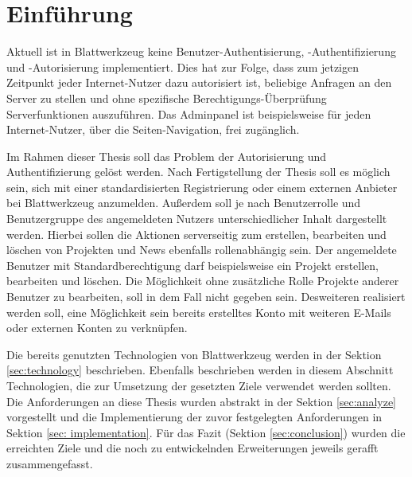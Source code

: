 \section{Einführung}
\label{sec:introduction}
Aktuell ist in Blattwerkzeug keine Benutzer-Authentisierung, -Authentifizierung und -Autorisierung implementiert. Dies hat zur Folge, dass zum jetzigen Zeitpunkt jeder Internet-Nutzer dazu autorisiert ist, beliebige Anfragen an den Server zu stellen und ohne spezifische Berechtigungs-Überprüfung Serverfunktionen auszuführen. Das Adminpanel ist beispielsweise für jeden Internet-Nutzer, über die Seiten-Navigation, frei zugänglich.

Im Rahmen dieser Thesis soll das Problem der Autorisierung und Authentifizierung gelöst werden. Nach Fertigstellung der Thesis soll es möglich sein, sich mit einer standardisierten Registrierung oder einem externen Anbieter bei Blattwerkzeug anzumelden. Au{\ss}erdem soll je nach Benutzerrolle und Benutzergruppe des angemeldeten Nutzers unterschiedlicher Inhalt dargestellt werden. Hierbei sollen die Aktionen serverseitig zum erstellen, bearbeiten und löschen von Projekten und News ebenfalls rollenabhängig sein. Der angemeldete Benutzer mit Standardberechtigung darf beispielsweise ein Projekt erstellen, bearbeiten und löschen. Die Möglichkeit ohne zusätzliche Rolle Projekte anderer Benutzer zu bearbeiten, soll in dem Fall nicht gegeben sein. Desweiteren realisiert werden soll, eine Möglichkeit sein bereits erstelltes Konto mit weiteren E-Mails oder externen Konten zu verknüpfen.


Die bereits genutzten Technologien von Blattwerkzeug werden in der Sektion \ref{sec:technology} beschrieben. Ebenfalls beschrieben werden in diesem Abschnitt Technologien, die zur Umsetzung der gesetzten Ziele verwendet werden sollten. Die Anforderungen an diese Thesis wurden abstrakt in der Sektion \ref{sec:analyze} vorgestellt und die Implementierung der zuvor festgelegten Anforderungen in Sektion \ref{sec: implementation}. Für das Fazit (Sektion \ref{sec:conclusion}) wurden die erreichten Ziele und die noch zu entwickelnden Erweiterungen jeweils gerafft zusammengefasst.


